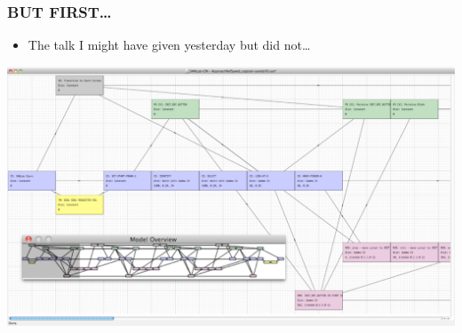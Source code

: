 \documentclass{beamer}
\begin{document}
\begin{frame}
	\frametitle{BUT FIRST\dots}
	\begin{itemize}
		\item The talk I might have given yesterday but did not\dots
	\end{itemize}
		\begin{center}
		\includegraphics[width=.75\textwidth]{../zNvBkFigs/fig4-SL}
	\end{center}
\end{frame}
\end{document}
